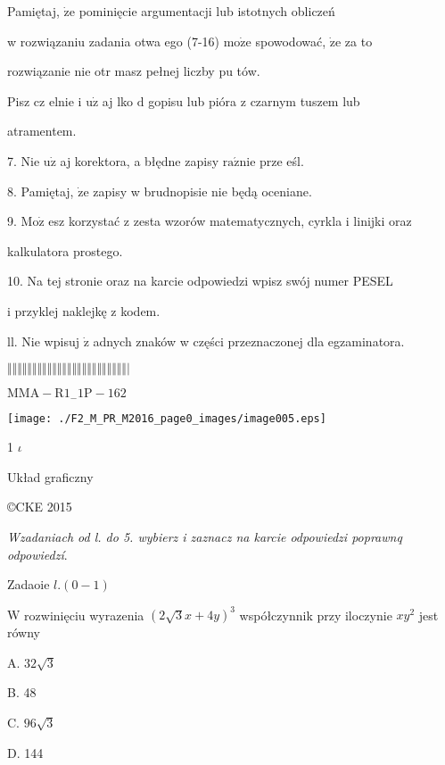 \documentclass[a4paper,12pt]{article}
\begin{document}
Pamiętaj, $\dot{\mathrm{z}}\mathrm{e}$ pominięcie argumentacji lub istotnych obliczeń

w rozwiązaniu zadania otwa ego (7-16) $\mathrm{m}\mathrm{o}\dot{\mathrm{z}}\mathrm{e}$ spowodować, $\dot{\mathrm{z}}\mathrm{e}$ za to

rozwiązanie nie otr masz pełnej liczby pu tów.

Pisz cz elnie i $\mathrm{u}\dot{\mathrm{z}}$ aj lko $\mathrm{d}$ gopisu lub pióra z czarnym tuszem lub

atramentem.

7. Nie $\mathrm{u}\dot{\mathrm{z}}$ aj korektora, a błędne zapisy $\mathrm{r}\mathrm{a}\acute{\mathrm{z}}\mathrm{n}\mathrm{i}\mathrm{e}$ prze eśl.

8. Pamiętaj, $\dot{\mathrm{z}}\mathrm{e}$ zapisy w brudnopisie nie będą oceniane.

9. $\mathrm{M}\mathrm{o}\dot{\mathrm{z}}$ esz korzystać z zesta wzorów matematycznych, cyrkla i linijki oraz

kalkulatora prostego.

10. Na tej stronie oraz na karcie odpowiedzi wpisz swój numer PESEL

i przyklej naklejkę z kodem.

ll. Nie wpisuj $\dot{\mathrm{z}}$ adnych znaków w części przeznaczonej dla egzaminatora.

$\Vert\Vert\Vert\Vert\Vert\Vert\Vert\Vert\Vert\Vert\Vert\Vert\Vert\Vert\Vert\Vert\Vert\Vert\Vert\Vert\Vert\Vert\Vert\Vert|$

$\mathrm{M}\mathrm{M}\mathrm{A}-\mathrm{R}1_{-}1\mathrm{P}-162$
\begin{center}
\texttt{[image: ./F2\_M\_PR\_M2016\_page0\_images/image005.eps]}
\end{center}
1  $\iota$

Układ graficzny

\copyright CKE 2015




{\it Wzadaniach od l. do 5. wybierz i zaznacz na karcie odpowiedzi poprawnq odpowiedzí}.

Zadaoie $l.(0-1)$

$\mathrm{W}$ rozwinięciu wyrazenia $(2\sqrt{3}x+4y)^{3}$ współczynnik przy iloczynie $xy^{2}$ jest równy

A. $32\sqrt{3}$

B. 48

C. $96\sqrt{3}$

D. 144
\end{document}
